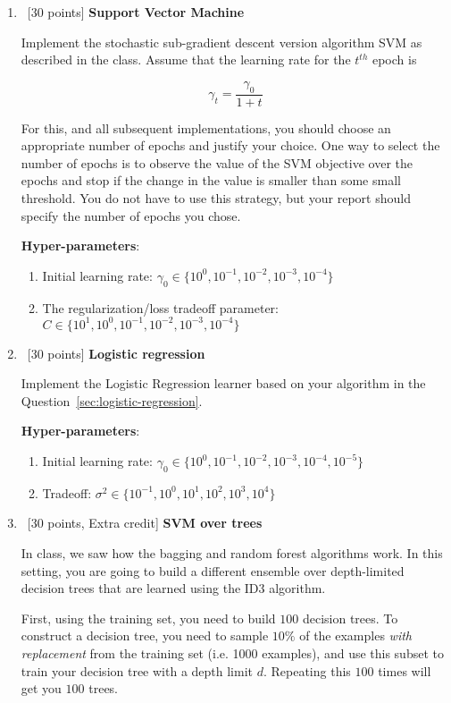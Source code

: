 \begin{enumerate}
\item~[30 points] \textbf{Support Vector Machine}

  Implement the stochastic sub-gradient descent version algorithm SVM as
  described in the class. Assume that the learning rate for the $t^{th}$ epoch
  is

  $$\gamma_t = \frac{\gamma_0}{1 + t}$$

  For this, and all subsequent implementations, you should choose an appropriate
  number of epochs and justify your choice. One way to select the number of
  epochs is to observe the value of the SVM objective over the epochs and stop
  if the change in the value is smaller than some small threshold. You do not
  have to use this strategy, but your report should specify the number of epochs
  you chose.

  \textbf{Hyper-parameters}: 
  \begin{enumerate}
  \item Initial learning rate: $\gamma_0\in\{10^0, 10^{-1}, 10^{-2}, 10^{-3}, 10^{-4}\}$
  \item The regularization/loss tradeoff parameter: $C\in \{10^1, 10^0, 10^{-1}, 10^{-2}, 10^{-3}, 10^{-4}\}$
  \end{enumerate}

  
\item~[30 points] \textbf{Logistic regression}

  Implement the Logistic Regression learner based on your algorithm in the
  Question~\ref{sec:logistic-regression}.

  \textbf{Hyper-parameters}: 
  \begin{enumerate}
  \item Initial learning rate: $\gamma_0\in\{10^0, 10^{-1}, 10^{-2}, 10^{-3}, 10^{-4}, 10^{-5}\}$
  \item Tradeoff: $\sigma^2\in \{10^{-1}, 10^0, 10^{1}, 10^{2}, 10^{3}, 10^{4}\}$
  \end{enumerate}

\item~[30 points, Extra credit] \textbf{SVM over trees}

  In class, we saw how the bagging and random forest algorithms work.  In this
  setting, you are going to build a different ensemble over depth-limited
  decision trees that are learned using the ID3 algorithm.

  First, using the training set, you need to build $100$ decision trees. To
  construct a decision tree, you need to sample $10\%$ of the examples {\em with
    replacement} from the training set (i.e. 1000 examples), and use this subset
  to train your decision tree with a depth limit $d$. Repeating this $100$ times
  will get you $100$ trees.


\end{enumerate}
